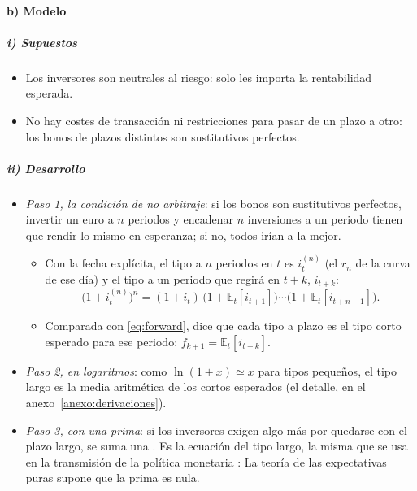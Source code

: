 \documentclass[11pt]{article}
\begin{document}
\paragraph{b) Modelo}
\subparagraph{i) Supuestos}
\begin{itemize}
\item Los inversores son neutrales al riesgo: solo les importa la rentabilidad esperada.
\item No hay costes de transacción ni restricciones para pasar de un plazo a otro: los bonos de plazos distintos son sustitutivos perfectos.
\end{itemize}

\subparagraph{ii) Desarrollo}
\begin{itemize}
\item \emph{Paso 1, la condición de no arbitraje}: si los bonos son sustitutivos perfectos, invertir un euro a $n$ periodos y encadenar $n$ inversiones a un periodo tienen que rendir lo mismo en esperanza; si no, todos irían a la mejor.
  \begin{itemize}
  \item Con la fecha explícita, el tipo a $n$ periodos en $t$ es $i^{(n)}_t$ (el $r_n$ de la curva de ese día) y el tipo a un periodo que regirá en $t+k$, $i_{t+k}$:
  \begin{equation}\label{eq:expectativas-exacta}
  \big(1+i^{(n)}_t\big)^n=(1+i_t)\,\big(1+\mathbb{E}_t[i_{t+1}]\big)\cdots\big(1+\mathbb{E}_t[i_{t+n-1}]\big).
  \end{equation}
  \item Comparada con \eqref{eq:forward}, dice que cada tipo a plazo es el tipo corto esperado para ese periodo: $f_{k+1}=\mathbb{E}_t[i_{t+k}]$.
  \end{itemize}
\item \emph{Paso 2, en logaritmos}: como $\ln(1+x)\simeq x$ para tipos pequeños, el tipo largo es la media aritmética de los cortos esperados (el detalle, en el anexo~\ref{anexo:derivaciones}).
\item \emph{Paso 3, con una prima}: si los inversores exigen algo más por quedarse con el plazo largo, se suma una . Es la ecuación del tipo largo, la misma que se usa en la transmisión de la política monetaria  :
  La teoría de las expectativas puras supone que la prima es nula.
\end{itemize}
\end{document}
